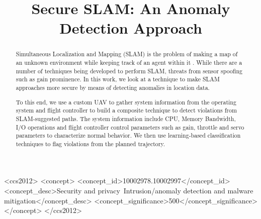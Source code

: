 \documentclass[sigconf]{acmart}
\begin{document}
\title{Secure SLAM: An Anomaly Detection Approach} %

\begin{abstract}
Simultaneous Localization and Mapping (SLAM) is the problem of making a map of an unknown environment while keeping track of an agent within it \cite{Thrun2008}. While there are a number of techniques being developed to perform SLAM, threats from sensor spoofing such as \cite{kerns2014unmanned} gain prominence. In this work, we look at a technique to make SLAM approaches more secure by means of detecting anomalies in location data. 

To this end, we use a custom UAV to gather system information from the operating system and flight controller to build a composite technique to detect violations from SLAM-suggested paths. The system information include CPU, Memory Bandwidth, I/O operations and flight controller control parameters such as gain, throttle and servo parameters to characterize normal behavior. We then use learning-based classification techniques to flag violations from the planned trajectory. 

\end{abstract}

\begin{CCSXML}
<ccs2012>
<concept>
<concept_id>10002978.10002997</concept_id>
<concept_desc>Security and privacy~Intrusion/anomaly detection and malware mitigation</concept_desc>
<concept_significance>500</concept_significance>
</concept>
</ccs2012>
\end{CCSXML}




\maketitle




\end{document}
